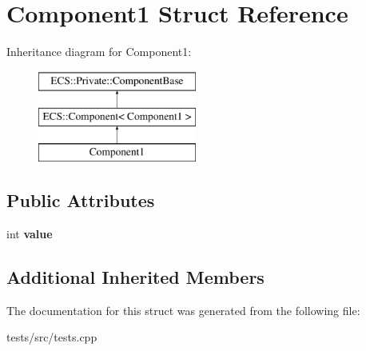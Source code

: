 \hypertarget{struct_component1}{\section{Component1 Struct Reference}
\label{struct_component1}
}
Inheritance diagram for Component1\-:\begin{figure}[H]
\begin{center}
\leavevmode
\includegraphics[height=3.000000cm]{struct_component1}
\end{center}
\end{figure}
\subsection*{Public Attributes}
\begin{DoxyCompactItemize}
\item 
\hypertarget{struct_component1_a269a044b8706f918d49731cddb0544b9}{int {\bfseries value}}\label{struct_component1_a269a044b8706f918d49731cddb0544b9}

\end{DoxyCompactItemize}
\subsection*{Additional Inherited Members}


The documentation for this struct was generated from the following file\-:\begin{DoxyCompactItemize}
\item 
tests/src/tests.\-cpp\end{DoxyCompactItemize}
